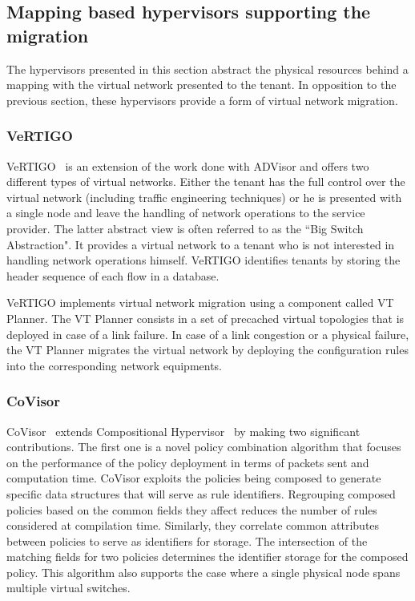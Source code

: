 \subsection{Mapping based hypervisors supporting the migration}
The hypervisors presented in this section abstract the physical resources behind a mapping with the virtual network presented to the tenant. In opposition to the previous section, these hypervisors provide a form of virtual network migration. 

\subsubsection{VeRTIGO}
VeRTIGO~\cite{VeRTIGO-Corin2012a} is an extension of the work done with ADVisor and offers two different types of virtual networks.
Either the tenant has the full control over the virtual network (including traffic engineering techniques) or he is presented with a single node and leave the handling of network operations to the service provider.
The latter abstract view is often referred to as the ``Big Switch Abstraction".
It provides a virtual network to a tenant who is not interested in handling network operations himself.
VeRTIGO identifies tenants by storing the header sequence of each flow in a database.

VeRTIGO implements virtual network migration using a component called VT Planner. The VT Planner consists in a set of precached virtual topologies that is deployed in case of a link failure. In case of a link congestion or a physical failure, the VT Planner migrates the virtual network by deploying the configuration rules into the corresponding network equipments.

\subsubsection{CoVisor}
CoVisor~\cite{CoVisor-Jin2015} extends Compositional Hypervisor~\cite{CompositionalHypervisor-Jin2014} by making two significant contributions.
The first one is a novel policy combination algorithm that focuses on the performance of the policy deployment in terms of packets sent and computation time.
CoVisor exploits the policies being composed to generate specific data structures that will serve as rule identifiers.
Regrouping composed policies based on the common fields they affect reduces the number of rules  considered at compilation time.
Similarly, they correlate common attributes between policies to serve as identifiers for storage. The intersection of the matching fields for two policies determines the identifier storage for the composed policy.
This algorithm also supports the case where a single physical node spans multiple virtual switches.

